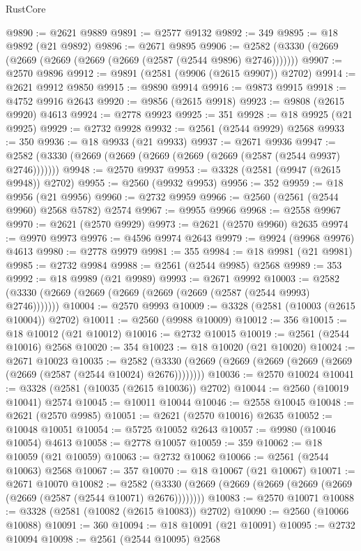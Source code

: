 \begin{lexlean}{RustCore}
\begin{coremodule}
@9890 := @2621 @9889
@9891 := @2577 @9132
@9892 := 349
@9895 := @18 @9892 (@21 @9892)
@9896 := @2671 @9895
@9906 := @2582 (@3330 (@2669 (@2669 (@2669 (@2669 (@2669 (@2587 (@2544 @9896) @2746)))))))
@9907 := @2570 @9896
@9912 := @9891 (@2581 (@9906 (@2615 @9907)) @2702)
@9914 := @2621 @9912 @9850
@9915 := @9890 @9914
@9916 := @9873 @9915
@9918 := @4752 @9916 @2643
@9920 := @9856 (@2615 @9918)
@9923 := @9808 (@2615 @9920) @4613
@9924 := @2778 @9923
@9925 := 351
@9928 := @18 @9925 (@21 @9925)
@9929 := @2732 @9928
@9932 := @2561 (@2544 @9929) @2568
@9933 := 350
@9936 := @18 @9933 (@21 @9933)
@9937 := @2671 @9936
@9947 := @2582 (@3330 (@2669 (@2669 (@2669 (@2669 (@2669 (@2587 (@2544 @9937) @2746)))))))
@9948 := @2570 @9937
@9953 := @3328 (@2581 (@9947 (@2615 @9948)) @2702)
@9955 := @2560 (@9932 @9953)
@9956 := 352
@9959 := @18 @9956 (@21 @9956)
@9960 := @2732 @9959
@9966 := @2560 (@2561 (@2544 @9960) @2568 @5782) @2574
@9967 := @9955 @9966
@9968 := @2558 @9967
@9970 := @2621 (@2570 @9929)
@9973 := @2621 (@2570 @9960) @2635
@9974 := @9970 @9973
@9976 := @4596 @9974 @2643
@9979 := @9924 (@9968 @9976) @4613
@9980 := @2778 @9979
@9981 := 355
@9984 := @18 @9981 (@21 @9981)
@9985 := @2732 @9984
@9988 := @2561 (@2544 @9985) @2568
@9989 := 353
@9992 := @18 @9989 (@21 @9989)
@9993 := @2671 @9992
@10003 := @2582 (@3330 (@2669 (@2669 (@2669 (@2669 (@2669 (@2587 (@2544 @9993) @2746)))))))
@10004 := @2570 @9993
@10009 := @3328 (@2581 (@10003 (@2615 @10004)) @2702)
@10011 := @2560 (@9988 @10009)
@10012 := 356
@10015 := @18 @10012 (@21 @10012)
@10016 := @2732 @10015
@10019 := @2561 (@2544 @10016) @2568
@10020 := 354
@10023 := @18 @10020 (@21 @10020)
@10024 := @2671 @10023
@10035 := @2582 (@3330 (@2669 (@2669 (@2669 (@2669 (@2669 (@2669 (@2587 (@2544 @10024) @2676))))))))
@10036 := @2570 @10024
@10041 := @3328 (@2581 (@10035 (@2615 @10036)) @2702)
@10044 := @2560 (@10019 @10041) @2574
@10045 := @10011 @10044
@10046 := @2558 @10045
@10048 := @2621 (@2570 @9985)
@10051 := @2621 (@2570 @10016) @2635
@10052 := @10048 @10051
@10054 := @5725 @10052 @2643
@10057 := @9980 (@10046 @10054) @4613
@10058 := @2778 @10057
@10059 := 359
@10062 := @18 @10059 (@21 @10059)
@10063 := @2732 @10062
@10066 := @2561 (@2544 @10063) @2568
@10067 := 357
@10070 := @18 @10067 (@21 @10067)
@10071 := @2671 @10070
@10082 := @2582 (@3330 (@2669 (@2669 (@2669 (@2669 (@2669 (@2669 (@2587 (@2544 @10071) @2676))))))))
@10083 := @2570 @10071
@10088 := @3328 (@2581 (@10082 (@2615 @10083)) @2702)
@10090 := @2560 (@10066 @10088)
@10091 := 360
@10094 := @18 @10091 (@21 @10091)
@10095 := @2732 @10094
@10098 := @2561 (@2544 @10095) @2568

\end{coremodule}
\end{lexlean}
